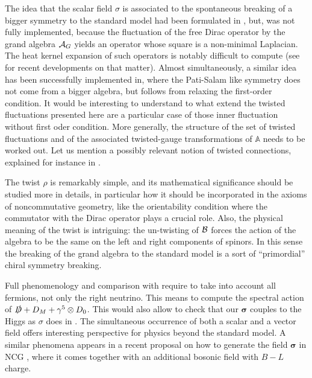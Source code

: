 \documentclass[11pt]{article}
\newcommand{\sig}{{\boldsymbol{\sigma}}}
\begin{document}
The idea that the scalar field $\sigma$ is associated to the
spontaneous breaking of a bigger symmetry to the standard model had been
formulated in 
\cite{Devastato:2013fk}, but, was not fully implemented, because the fluctuation of the
free Dirac operator by the grand algebra ${\cal A}_G$ yields an operator whose
square is a non-minimal Laplacian. The heat kernel expansion of
such operators is notably difficult to compute (see
\cite{Iochum:2016aa} for recent developments on that matter).  Almost
simultaneously, a similar idea has been successfully 
implemented in\cite{Chamseddine:2013fk}, where the Pati-Salam like symmetry does not come
from a bigger algebra, but follows from relaxing the first-order
condition.
It would be interesting to understand to what extend the twisted
fluctuations presented here are a particular case of those inner
fluctuation without first oder condition. More generally, the
  structure of the set of twisted fluctuations and of the associated
  twisted-gauge transformations of $\mathbb A$ needs to be
  worked out. Let us mention a possibly relevant notion of twisted
  connections, explained for instance in
  \cite{Fathizadeh:2011aa}.
\medskip

The twist $\rho$ is remarkably
  simple, and its mathematical significance should be studied more in
  details, in particular how it should be incorporated in the axioms
  of noncommutative geometry, like the orientability condition where
the commutator with the Dirac operator plays a crucial role. Also, the physical meaning of the twist is intriguing:
  the un-twisting of $\cal B$ forces the action of the algebra to be the same on the left and right components of
  spinors. In this sense the breaking of the grand algebra to the
  standard model is a sort of ``primordial'' chiral
  symmetry breaking.
\medskip

Full phenomenology and comparison with \cite{Chamseddine:2013uq}
require to take into account all fermions, not
only the right neutrino. This means to compute the spectral action of $\slashed D + D_M  +
\gamma^5\otimes D_0$. This would also allow to check that our $\boldsymbol
\sigma$ couples to the Higgs as $\sigma$ does in
\cite{Chamseddine:2012fk}. The simultaneous occurrence of both
  a scalar and a vector field offers interesting perspective for
  physics beyond the standard model. A similar phenomena
    appears in a recent
   proposal on how to  generate the field $\sig$ in NCG \cite{Farnsworth:2014aa}, where it
   comes together with an additional bosonic field with $B-L$ charge. 
\medskip
\end{document}
